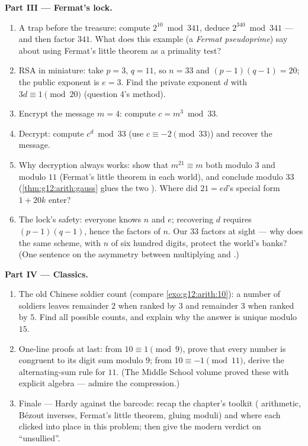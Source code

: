 \begin{problem}
\medskip
\noindent\textbf{Part III --- Fermat's lock.}
\begin{enumerate}[resume]
  \item A trap before the treasure: compute
        $2^{10} \bmod 341$, deduce $2^{340} \bmod 341$ --- and
        then factor $341$. What does this example (a
        \emph{Fermat pseudoprime}) say about using Fermat's
        little theorem as a primality test?
  \item RSA in miniature: take $p = 3$, $q = 11$, so
        $n = 33$ and $(p-1)(q-1) = 20$; the public exponent is
        $e = 3$. Find the private exponent $d$ with
        $3d \equiv 1 \pmod{20}$ (question 4's method).
  \item Encrypt the message $m = 4$: compute
        $c = m^3 \bmod 33$.
  \item Decrypt: compute $c^d \bmod 33$ (use
        $c \equiv -2 \pmod{33}$) and recover the message.
  \item Why decryption always works: show that
        $m^{21} \equiv m$ both modulo $3$ and modulo $11$
        (Fermat's little theorem in each world), and conclude
        modulo $33$ (\cref{thm:g12:arith:gauss} glues the two
        ). Where did $21 = ed$'s special form
        $1 + 20k$ enter?
  \item The lock's safety: everyone knows $n$ and $e$;
        recovering $d$ requires $(p-1)(q-1)$, hence the factors
        of $n$. Our $33$ factors at sight --- why does the same
        scheme, with $n$ of six hundred digits, protect the
        world's banks? (One sentence on the asymmetry between
        multiplying and .)
\end{enumerate}

\medskip
\noindent\textbf{Part IV --- Classics.}
\begin{enumerate}[resume]
  \item The old Chinese soldier count (compare
        \cref{exo:g12:arith:10}): a number of soldiers leaves
        remainder $2$ when ranked by $3$ and remainder $3$ when
        ranked by $5$. Find all possible counts, and explain
        why the answer is unique modulo $15$.
  \item One-line proofs at last: from $10 \equiv 1 \pmod 9$,
        prove that every number is congruent to its digit sum
        modulo $9$; from $10 \equiv -1 \pmod{11}$, derive the
        alternating-sum rule for $11$. (The Middle School
        volume proved these with explicit algebra --- admire
        the compression.)
  \item Finale --- Hardy against the barcode: recap the
        chapter's toolkit ( arithmetic, B\'ezout
        inverses, Fermat's little theorem, gluing 
        moduli) and where each clicked into place in this
        problem; then give the modern verdict on
        ``unsullied''.
\end{enumerate}
\end{problem}
